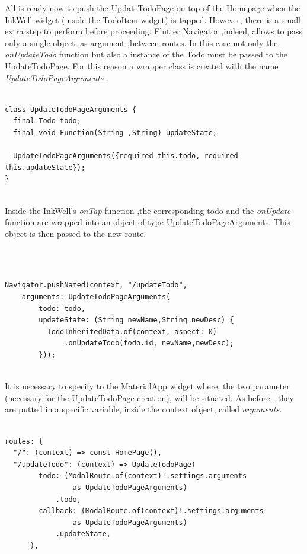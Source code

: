 All is ready now to push the UpdateTodoPage on top of the Homepage when the InkWell widget (inside the TodoItem widget) is tapped. However, there is a small extra step to perform before proceeding.  Flutter Navigator ,indeed, allows to pass only a single object ,as argument ,between routes. In this case not only the \textit{onUpdateTodo} function but also a instance of the Todo must be passed to the UpdateTodoPage. For this reason a wrapper class is created with the name \textit{UpdateTodoPageArguments }.
\mbox{}\\
\begin{code}

\label{code:2.40}
\begin{verbatim}

class UpdateTodoPageArguments {
  final Todo todo;
  final void Function(String ,String) updateState;

  UpdateTodoPageArguments({required this.todo, required this.updateState});
}
\end{verbatim}
\end{code}
\mbox{}\\
Inside the InkWell’s \textit{onTap }function ,the corresponding todo and the \textit{onUpdate} function are wrapped into an object of type UpdateTodoPageArguments. This object is then passed to the new route.
\mbox{}\\
\begin{code}
\mbox{}\\
\label{code:2.42}
\begin{verbatim}

Navigator.pushNamed(context, "/updateTodo",
    arguments: UpdateTodoPageArguments(
        todo: todo,
        updateState: (String newName,String newDesc) {
          TodoInheritedData.of(context, aspect: 0)
              .onUpdateTodo(todo.id, newName,newDesc);
        }));
\end{verbatim}
\end{code}
\mbox{}\\
It is necessary to specify to the MaterialApp widget where, the two parameter (necessary for the UpdateTodoPage creation), will be situated. As before , they are putted in a specific variable, inside the context object, called \textit{arguments.}
\mbox{}\\
\begin{code}

\label{code:2.42}
\begin{verbatim}

routes: {
  "/": (context) => const HomePage(),
  "/updateTodo": (context) => UpdateTodoPage(
        todo: (ModalRoute.of(context)!.settings.arguments
                as UpdateTodoPageArguments)
            .todo,
        callback: (ModalRoute.of(context)!.settings.arguments
                as UpdateTodoPageArguments)
            .updateState,
      ),
\end{verbatim}
\end{code}
